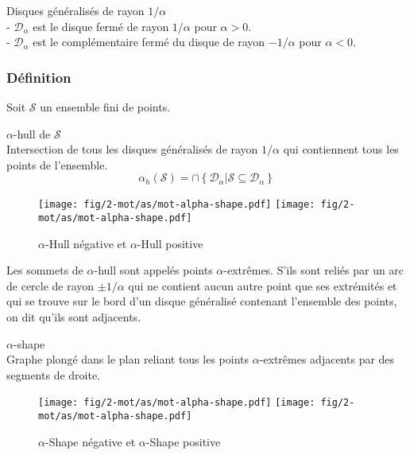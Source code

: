 \begin{Definition}{Disques généralisés de rayon $1/\alpha$}\\
\label{def:dis-gen}
   \noindent - $\mathcal{D}_{\alpha}$ est le disque fermé de rayon $1/\alpha$ pour $\alpha > 0$.\\
   \noindent - $\mathcal{D}_{\alpha}$ est le complémentaire fermé du disque de rayon $- 1/\alpha$ pour $\alpha < 0$.
\end{Definition}

\subsubsection{Définition}

Soit $\mathcal{S}$ un ensemble fini de points. 

\begin{Definition}{$\alpha$-hull de $\mathcal{S}$}\\
\label{def:ah-txt}
    Intersection de tous les disques généralisés de rayon $1/\alpha$ qui contiennent tous les points de l'ensemble.
    $$ \alpha_h(\mathcal{S}) = \cap \left\{ \mathcal{D}_{\alpha} | \mathcal{S} \subseteq \mathcal{D}_{\alpha} \right\}$$
\end{Definition}

\begin{figure}[H]
  \centering
  \texttt{[image: fig/2-mot/as/mot-alpha-shape.pdf]}
  \texttt{[image: fig/2-mot/as/mot-alpha-shape.pdf]}
  \caption{$\alpha$-Hull négative et $\alpha$-Hull positive }
\end{figure}
  
Les sommets de $\alpha$-hull sont appelés points $\alpha$-extrêmes. S'ils sont reliés par un arc de cercle de rayon $\pm 1/ \alpha$ qui ne contient aucun autre point que ses extrémités et qui se trouve sur le bord d'un disque généralisé contenant l'ensemble des points, on dit qu'ils sont adjacents.

\begin{Definition}{$\alpha$-shape}\\
\label{def:as}
      Graphe plongé dans le plan reliant tous les points $\alpha$-extrêmes adjacents par des segments de droite.
\end{Definition}

\begin{figure}[H]
  \centering
  \texttt{[image: fig/2-mot/as/mot-alpha-shape.pdf]}
  \texttt{[image: fig/2-mot/as/mot-alpha-shape.pdf]}
  \caption{$\alpha$-Shape négative et $\alpha$-Shape positive }
\end{figure}


